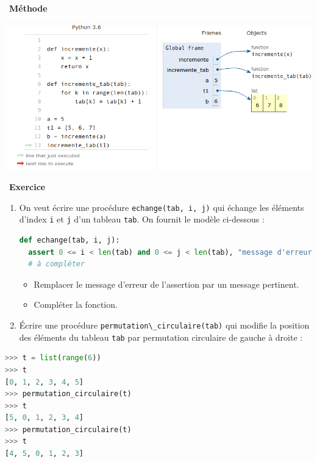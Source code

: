 \documentclass[
  11pt,
]{article}
\newcommand{\passthrough}[1]{#1}
\providecommand{\tightlist}{%
  \setlength{\itemsep}{0pt}\setlength{\parskip}{0pt}}
\newcounter{exo}
\newenvironment{exercice}[1]
{\par \medskip   \addtocounter{exo}{1} \noindent  
\begin{bclogo}[arrondi =0.1,   noborder = true, logo=\bccrayon, marge=4]{~\textbf{Exercice} \textbf{\theexo} {\itshape #1} }  \par}
{
\end{bclogo}
 \par \bigskip }
\newcounter{def}
\newenvironment{methode}[1]
{\par \medskip    \noindent  
 \begin {bclogo}[arrondi =0.1,logo=\bcoutil, marge=4,noborder = true] {~\textbf{Méthode}   {\itshape #1} }  \par}
{
\end{bclogo}
 \par \bigskip }
\begin{document}
\begin{methode}{}
\begin{itemize}
  \includegraphics{images/aliasing-fonction6.png}\\
\end{itemize}

\end{methode}

\begin{exercice}{}

\begin{enumerate}
\def\labelenumi{\arabic{enumi}.}
\item
  On veut écrire une procédure
  \passthrough{\lstinline!echange(tab, i, j)!} qui échange les éléments
  d'index \passthrough{\lstinline!i!} et \passthrough{\lstinline!j!}
  d'un tableau \passthrough{\lstinline!tab!}. On fournit le modèle
  ci-dessous :

\begin{lstlisting}[language=Python]
def echange(tab, i, j):
  assert 0 <= i < len(tab) and 0 <= j < len(tab), "message d'erreur"
  # à compléter
\end{lstlisting}

  \begin{itemize}
  \tightlist
  \item
    Remplacer le message d'erreur de l'assertion par un message
    pertinent.
  \item
    Compléter la fonction.
  \end{itemize}
\item
  Écrire une procédure
  \passthrough{\lstinline!permutation\_circulaire(tab)!} qui modifie la
  position des éléments du tableau \passthrough{\lstinline!tab!} par
  permutation circulaire de gauche à droite :\\
\end{enumerate}

\begin{lstlisting}[language=Python]
>>> t = list(range(6))
>>> t
[0, 1, 2, 3, 4, 5]
>>> permutation_circulaire(t)
>>> t
[5, 0, 1, 2, 3, 4]
>>> permutation_circulaire(t)
>>> t
[4, 5, 0, 1, 2, 3]
\end{lstlisting}

\end{exercice}
\end{document}

